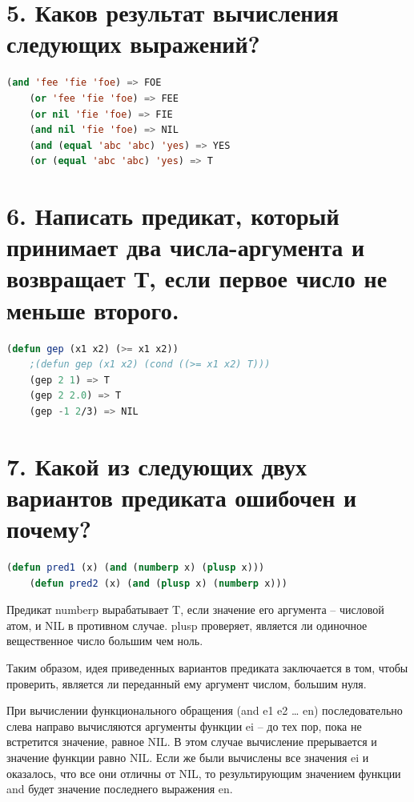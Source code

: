 \documentclass[12pt]{report}
\begin{document}
\section*{5. Каков результат вычисления следующих выражений?}

\begin{lstlisting}[language=Lisp]
	(and 'fee 'fie 'foe) => FOE
	(or 'fee 'fie 'foe) => FEE
	(or nil 'fie 'foe) => FIE
	(and nil 'fie 'foe) => NIL
	(and (equal 'abc 'abc) 'yes) => YES
	(or (equal 'abc 'abc) 'yes) => T
\end{lstlisting}

\section*{6. Написать предикат, который принимает два числа-аргумента и возвращает Т, если первое число не меньше второго.}

\begin{lstlisting}[language=Lisp]
	(defun gep (x1 x2) (>= x1 x2))
	;(defun gep (x1 x2) (cond ((>= x1 x2) T)))
	(gep 2 1) => T
	(gep 2 2.0) => T
	(gep -1 2/3) => NIL
\end{lstlisting}


\section*{7. Какой из следующих двух вариантов предиката ошибочен и почему?}

\begin{lstlisting}[language=Lisp]
	(defun pred1 (x) (and (numberp x) (plusp x))) 
	(defun pred2 (x) (and (plusp x) (numberp x)))
\end{lstlisting}

Предикат numberp вырабатывает T, если значение его аргумента – числовой атом, и NIL в противном случае. plusp проверяет, является ли одиночное вещественное число большим чем ноль.

Таким образом, идея приведенных вариантов предиката заключается в том, чтобы проверить, является ли переданный ему аргумент числом, большим нуля.

При вычислении функционального обращения (and e1 e2 … en) последовательно слева направо вычисляются аргументы функции ei – до тех пор, пока не  встретится значение, равное NIL. В этом случае вычисление прерывается и значение функции равно NIL. Если же были вычислены все значения ei и  оказалось, что все они отличны от NIL, то результирующим значением функции and будет значение последнего выражения en.
\end{document}
